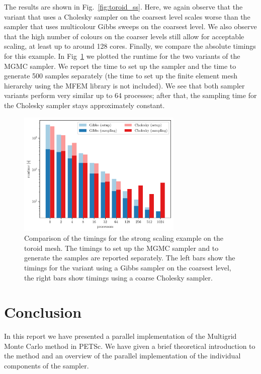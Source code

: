 \documentclass[
fontsize=11pt,
paper=a4,
numbers=noenddot
]{scrartcl}
\begin{document}
The results are shown in Fig.~\ref{fig:toroid_ss}. Here, we again observe that the variant that uses a Cholesky sampler on the coarsest level scales worse than the sampler that uses multicolour Gibbs sweeps on the coarsest level. We also observe that the high number of colours on the coarser levels still allow for acceptable scaling, at least up to around 128 cores. Finally, we compare the absolute timings for this example. In Fig~\ref{fig:timings} we plotted the runtime for the two variants of the MGMC sampler. We report the time to set up the sampler and the time to generate 500 samples separately (the time to set up the finite element mesh hierarchy using the MFEM library is not included). We see that both sampler variants perform very similar up to 64 processes; after that, the sampling time for the Cholesky sampler stays approximately constant.

\begin{figure}[htbp]
    \centering
    \includegraphics[width=0.7\textwidth]{plots/runtime.pdf}
    \caption{Comparison of the timings for the strong scaling example on the toroid mesh. The timings to set up the MGMC sampler and to generate the samples are reported separately. The left bars show the timings for the variant using a Gibbs sampler on the coarsest level, the right bars show timings using a coarse Cholesky sampler.}
    \label{fig:timings}
\end{figure}

\section{Conclusion}
In this report we have presented a parallel implementation of the Multigrid Monte Carlo method in PETSc. We have given a brief theoretical introduction to the method and an overview of the parallel implementation of the individual components of the sampler.
\end{document}
